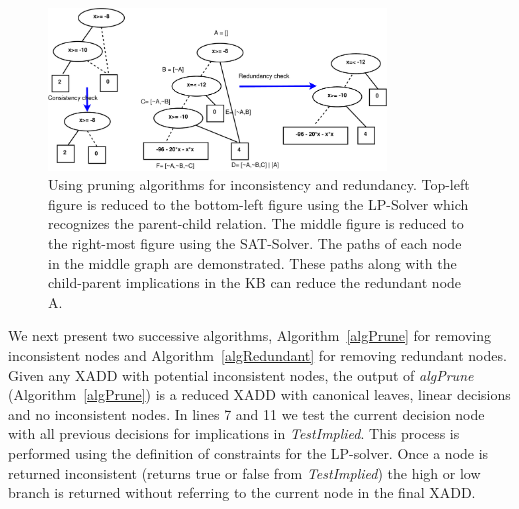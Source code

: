 \documentclass[twoside,11pt]{article}
\begin{document}
\vspace{10mm}
\begin{figure}[t!]
\centering
\vspace{-3mm}
\includegraphics[width=0.8\textwidth]{Figures1/diagrams/redundancy.pdf}
\vspace{-2mm}

\caption{\footnotesize Using pruning algorithms for inconsistency and redundancy. Top-left figure is reduced to the bottom-left figure using the LP-Solver which recognizes the parent-child relation. The middle figure is reduced to the right-most figure using the SAT-Solver. The paths of each node in the middle graph are demonstrated. These paths along with the child-parent implications in the KB can reduce the redundant node A.}
\label{fig:canonical}
\vspace{-6mm}
\end{figure}
We next present two successive algorithms, Algorithm~\ref{algPrune} for removing inconsistent nodes and Algorithm~\ref{algRedundant} for removing redundant nodes. 
Given any XADD with potential inconsistent nodes, the output of \emph{algPrune} (Algorithm~\ref{algPrune}) is a reduced XADD with canonical leaves, linear decisions and no inconsistent nodes. 
In lines 7 and 11 we test the current decision node with all previous decisions for implications in \emph{TestImplied}. 
This process is performed using the definition of constraints for the LP-solver. Once a node is returned inconsistent (returns true or false from \emph{TestImplied}) the high or low branch is returned without referring to the current node in the final XADD. 
\end{document}
